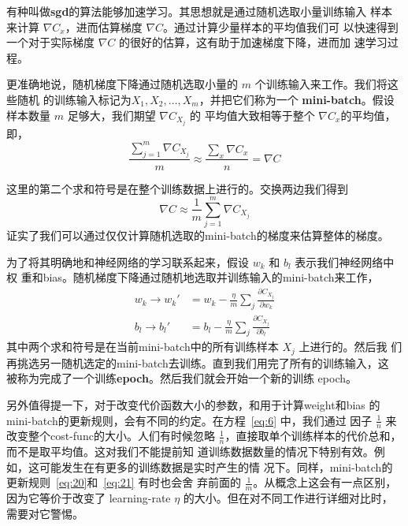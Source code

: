 有种叫做\textbf{\gls{sgd}}的算法能够加速学习。其思想就是通过随机选取小量训练输入
样本来计算 $\nabla C_x$，进而估算梯度 $\nabla C$。通过计算少量样本的平均值我们可
以快速得到一个对于实际梯度 $\nabla C$ 的很好的估算，这有助于加速梯度下降，进而加
速学习过程。

更准确地说，随机梯度下降通过随机选取小量的 $m$ 个训练输入来工作。我们将这些随机
的训练输入标记为$X_1, X_2, \ldots, X_m$，并把它们称为一个%
\textbf{\gls{mini-batch}}。假设样本数量 $m$ 足够大，我们期望 $\nabla C_{X_j}$ 的
平均值大致相等于整个 $\nabla C_x$的平均值，即，
\begin{equation}
  \frac{\sum_{j=1}^m \nabla C_{X_{j}}}{m} \approx \frac{\sum_x \nabla C_x}{n} = \nabla C
  \label{eq:18}\tag{18}
\end{equation}

这里的第二个求和符号是在整个训练数据上进行的。交换两边我们得到
\begin{equation}
  \nabla C \approx \frac{1}{m} \sum_{j=1}^m \nabla C_{X_{j}}
  \label{eq:19}\tag{19}
\end{equation}
证实了我们可以通过仅仅计算随机选取的\gls*{mini-batch}的梯度来估算整体的梯度。

为了将其明确地和神经网络的学习联系起来，假设 $w_k$ 和 $b_l$ 表示我们神经网络中权
重和\gls*{bias}。随机梯度下降通过随机地选取并训练输入的\gls*{mini-batch}来工作，
\begin{align}
  \label{eq:20}w_k \rightarrow w_k' &= w_k-\frac{\eta}{m}
                                      \sum_j \frac{\partial C_{X_j}}{\partial w_k}
                                      \tag{20}\\
  \label{eq:21}b_l \rightarrow b_l' &= b_l-\frac{\eta}{m}
                                      \sum_j \frac{\partial C_{X_j}}{\partial b_l}
                                      \tag{21}
\end{align}
其中两个求和符号是在当前\gls*{mini-batch}中的所有训练样本 $X_j$ 上进行的。然后我
们再挑选另一随机选定的\gls*{mini-batch}去训练。直到我们用完了所有的训练输入，这
被称为完成了一个训练\textbf{\gls{epoch}}。然后我们就会开始一个新的训练
\gls*{epoch}。

另外值得提一下，对于改变代价函数大小的参数，和用于计算\gls*{weight}和\gls*{bias}
的\gls*{mini-batch}的更新规则，会有不同的约定。在方程~\eqref{eq:6} 中，我们通过
因子 $\frac{1}{n}$ 来改变整个\gls*{cost-func}的大小。人们有时候忽略
$\frac{1}{n}$，直接取单个训练样本的代价总和，而不是取平均值。这对我们不能提前知
道训练数据数量的情况下特别有效。例如，这可能发生在有更多的训练数据是实时产生的情
况下。同样，\gls*{mini-batch}的更新规则~\eqref{eq:20}和~\eqref{eq:21} 有时也会舍
弃前面的 $\frac{1}{m}$。从概念上这会有一点区别，因为它等价于改变了%
\gls*{learning-rate} $\eta$ 的大小。但在对不同工作进行详细对比时，需要对它警惕。

